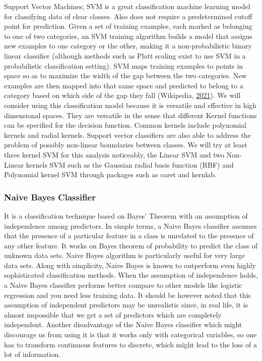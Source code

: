 \documentclass[
  10pt,
]{article}
\begin{document}
Support Vector Machines; SVM is a great classification machine learning model for classifying data of clear classes. Also does not require a predetermined cutoff point for prediction. Given a set of training examples, each marked as belonging to one of two categories, an SVM training algorithm builds a model that assigns new examples to one category or the other, making it a non-probabilistic binary linear classifier (although methods such as Platt scaling exist to use SVM in a probabilistic classification setting). SVM maps training examples to points in space so as to maximize the width of the gap between the two categories. New examples are then mapped into that same space and predicted to belong to a category based on which side of the gap they fall (Wikipedia, \protect\hyperlink{ref-wikipedia}{2021}).
We will consider using this classification model because it is versatile and effective in high dimensional spaces. They are versatile in the sense that different Kernel functions can be specified for the decision function. Common kernels include polynomial kernels and radial kernels. Support vector classifiers are also able to address the problem of possibly non-linear boundaries between classes. We will try at least three kernel SVM for this analysis noticeably, the Linear SVM and two Non-Linear kernels SVM such as the Gaussian radial basis function (RBF) and Polynomial kernel SVM through packages such as caret and kernlab.

\subsubsection{Naive Bayes Classifier}

It is a classification technique based on Bayes' Theorem with an assumption of independence among predictors. In simple terms, a Naive Bayes classifier assumes that the presence of a particular feature in a class is unrelated to the presence of any other feature. It works on Bayes theorem of probability to predict the class of unknown data sets. Naive Bayes algorithm is particularly useful for very large data sets. Along with simplicity, Naive Bayes is known to outperform even highly sophisticated classification methods. When the assumption of independence holds, a Naive Bayes classifier performs better compare to other models like logistic regression and you need less training data. It should be however noted that this assumption of independent predictors may be unrealistic since, in real life, it is almost impossible that we get a set of predictors which are completely independent. Another disadvantage of the Naive Bayes classifier which might discourage us from using it is that it works only with categorical variables, so one has to transform continuous features to discrete, which might lead to the loss of a lot of information.
\end{document}
